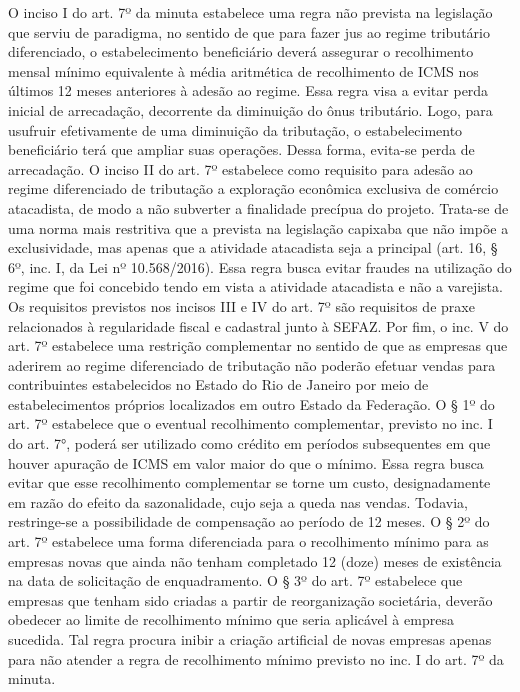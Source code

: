 \documentclass[10pt]{article}
\begin{document}
O inciso I do art. 7º da minuta estabelece uma regra não prevista na legislação que serviu de paradigma, no sentido de que para fazer jus ao regime tributário diferenciado, o estabelecimento beneficiário deverá assegurar o recolhimento mensal mínimo equivalente à média aritmética de recolhimento de ICMS nos últimos 12 meses anteriores à adesão ao regime. 
Essa regra visa a evitar perda inicial de arrecadação, decorrente da diminuição do ônus tributário. Logo, para usufruir efetivamente de uma diminuição da tributação, o estabelecimento beneficiário terá que ampliar suas operações. Dessa forma, evita-se perda de arrecadação. 
O inciso II do art. 7º estabelece como requisito para adesão ao regime diferenciado de tributação a exploração econômica exclusiva de comércio atacadista, de modo a não subverter a finalidade precípua do projeto. Trata-se de uma norma mais restritiva que a prevista na legislação capixaba que não impõe a exclusividade, mas apenas que a atividade atacadista seja a principal (art. 16, § 6º, inc. I, da Lei nº 10.568/2016). Essa regra busca evitar fraudes na utilização do regime que foi concebido tendo em vista a atividade atacadista e não a varejista.
Os requisitos previstos nos incisos III e IV do art. 7º são requisitos de praxe relacionados à regularidade fiscal e cadastral junto à SEFAZ.
Por fim, o inc. V do art. 7º estabelece uma restrição complementar no sentido de que as empresas que aderirem ao regime diferenciado de tributação não poderão efetuar vendas para contribuintes estabelecidos no Estado do Rio de Janeiro por meio de estabelecimentos próprios localizados em outro Estado da Federação. 
O § 1º do art. 7º estabelece que o eventual recolhimento complementar, previsto no inc. I do art. 7°, poderá ser utilizado como crédito em períodos subsequentes em que houver apuração de ICMS em valor maior do que o mínimo. Essa regra busca evitar que esse recolhimento complementar se torne um custo, designadamente em razão do efeito da sazonalidade, cujo seja a queda nas vendas. Todavia, restringe-se a possibilidade de compensação ao período de 12 meses. 
O § 2º do art. 7º estabelece uma forma diferenciada para o recolhimento mínimo para as empresas novas que ainda não tenham completado 12 (doze) meses de existência na data de solicitação de enquadramento. 
O § 3º do art. 7º estabelece que empresas que tenham sido criadas a partir de reorganização societária, deverão obedecer ao limite de recolhimento mínimo que seria aplicável à empresa sucedida. Tal regra procura inibir a criação artificial de novas empresas apenas para não atender a regra de recolhimento mínimo previsto no inc. I do art. 7º da minuta.
\end{document}
